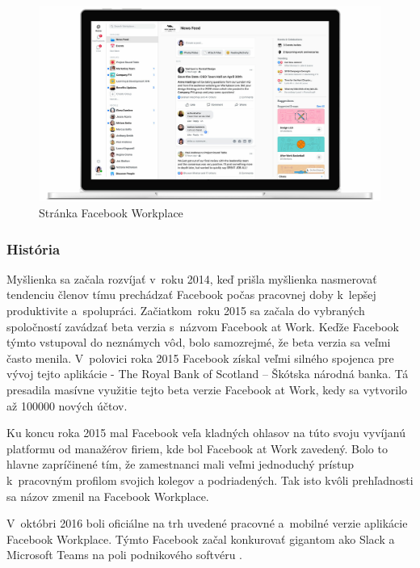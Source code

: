 \begin{figure}[H]
    \centering
    \includegraphics[scale=0.25]{img/obr-fb-workplace.jpg}
    \caption{Stránka Facebook Workplace \cite{facebook_workplace_2}}
    \label{fig:img-fb-workplace}
\end{figure}

\subsubsection{História}
\indent Myšlienka sa začala rozvíjať v roku 2014, keď prišla myšlienka nasmerovať tendenciu členov tímu prechádzať Facebook počas pracovnej doby k lepšej produktivite a spolupráci. Začiatkom roku 2015 sa začala do vybraných spoločností zavádzať beta verzia s názvom Facebook at Work. Keďže Facebook týmto vstupoval do neznámych vôd, bolo samozrejmé, že beta verzia sa veľmi často menila. V polovici roka 2015 Facebook získal veľmi silného spojenca pre vývoj tejto aplikácie - The Royal Bank of Scotland – Škótska národná banka. Tá presadila masívne využitie tejto beta verzie Facebook at Work, kedy sa vytvorilo až 100000 nových účtov. 

\indent Ku koncu roka 2015 mal Facebook veľa kladných ohlasov na túto svoju vyvíjanú platformu od manažérov firiem, kde bol Facebook at Work zavedený. Bolo to hlavne zapríčinené tím, že zamestnanci mali veľmi jednoduchý prístup k pracovným profilom svojich kolegov a podriadených. Tak isto kvôli prehľadnosti sa názov zmenil na Facebook Workplace.

\indent  V októbri 2016 boli oficiálne na trh uvedené pracovné a mobilné verzie aplikácie Facebook Workplace. Týmto Facebook začal konkurovať gigantom ako Slack a Microsoft Teams na poli podnikového softvéru \cite{facebook_workplace,facebook_workplace_2}.
